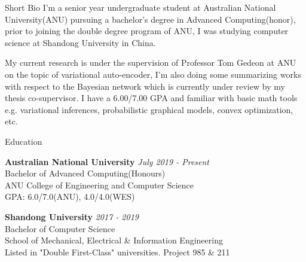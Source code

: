 \documentclass{resume} %
\begin{document}
\begin{rSection}{Short Bio}
I’m a senior year undergraduate student at Australian National University(ANU) pursuing a bachelor's degree in Advanced Computing(honor), prior to joining the double degree program of ANU, I was studying computer science at Shandong University in China.

My current research is under the supervision of Professor Tom Gedeon at ANU on the topic of variational auto-encoder, I’m also doing some summarizing works with respect to the Bayesian network which is currently under review by my thesis co-supervisor. I have a 6.00/7.00 GPA and familiar with basic math tools e.g. variational inferences, probabilistic graphical models, convex optimization, etc.
\end{rSection}

\begin{rSection}{Education}

{\bf Australian National University} \hfill {\em July 2019 - Present} 
\\ Bachelor of Advanced Computing(Honours)
\\ ANU College of Engineering and Computer Science\\
 { GPA: 6.0/7.0(ANU), 4.0/4.0(WES) }
 
 {\bf Shandong University} \hfill {\em 2017 - 2019} 
\\ Bachelor of Computer Science
\\ School of Mechanical, Electrical \& Information Engineering
\\ Listed in "Double First-Class" universities. Project 985 \& 211


\end{rSection}
\end{document}
